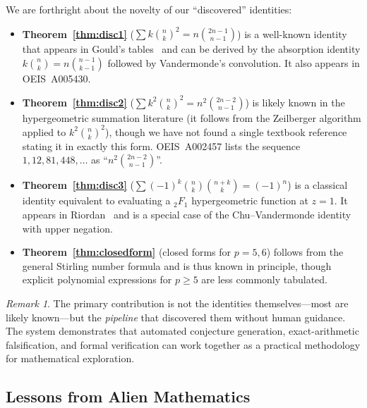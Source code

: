 \documentclass[11pt,a4paper]{article}
\theoremstyle{definition}
\theoremstyle{remark}
\newtheorem{remark}[theorem]{Remark}
\begin{document}
We are forthright about the novelty of our ``discovered'' identities:

\begin{itemize}
  \item \textbf{Theorem~\ref{thm:disc1}}
        ($\sum k\binom{n}{k}^2=n\binom{2n-1}{n-1}$)
        is a well-known identity that appears in Gould's tables~\cite{Gould1972}
        and can be derived by the absorption identity
        $k\binom{n}{k}=n\binom{n-1}{k-1}$ followed by Vandermonde's
        convolution.  It also appears in OEIS~A005430.

  \item \textbf{Theorem~\ref{thm:disc2}}
        ($\sum k^2\binom{n}{k}^2=n^2\binom{2n-2}{n-1}$)
        is likely known in the hypergeometric summation literature
        (it follows from the Zeilberger algorithm applied to
        $k^2\binom{n}{k}^2$), though we have not found a single
        textbook reference stating it in exactly this form.
        OEIS~A002457 lists the sequence $1,12,81,448,\dots$ as
        ``$n^2\binom{2n-2}{n-1}$''.

  \item \textbf{Theorem~\ref{thm:disc3}}
        ($\sum(-1)^k\binom{n}{k}\binom{n+k}{k}=(-1)^n$)
        is a classical identity equivalent to evaluating a
        $_2F_1$ hypergeometric function at $z=1$.  It appears in
        Riordan~\cite{Riordan1968} and is a special case of the
        Chu--Vandermonde identity with upper negation.

  \item \textbf{Theorem~\ref{thm:closedform}}
        (closed forms for $p=5,6$) follows from the general
        Stirling number formula and is thus known in principle,
        though explicit polynomial expressions for $p\ge5$
        are less commonly tabulated.
\end{itemize}

\begin{remark}
The primary contribution is not the identities themselves---most are
likely known---but the \emph{pipeline} that discovered them without
human guidance.  The system demonstrates that automated conjecture
generation, exact-arithmetic falsification, and formal verification
can work together as a practical methodology for mathematical
exploration.
\end{remark}

\subsection{Lessons from Alien Mathematics}\label{sec:alien}
\end{document}
